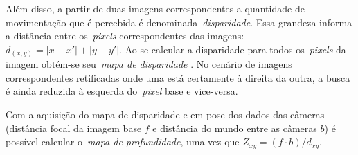 Além disso, a partir de duas imagens correspondentes a quantidade de movimentação que é percebida é denominada~\emph{disparidade}. Essa grandeza informa a distância entre os~\emph{pixels} correspondentes das imagens: $d_{(x, y)} = |x - x'| + |y - y'|$. Ao se calcular a disparidade para todos os~\emph{pixels} da imagem obtém-se seu~\emph{mapa de disparidade}
. No cenário de imagens correspondentes retificadas onde uma está certamente à direita da outra, a busca é ainda reduzida à esquerda do~\emph{pixel} base e vice-versa.


Com a aquisição do mapa de disparidade e em pose dos dados das câmeras (distância focal da imagem base $f$ e distância do mundo entre as câmeras $b$) é possível calcular o~\emph{mapa de profundidade}, uma vez que $Z_{xy} = (f \cdot b) /d_{xy}$.